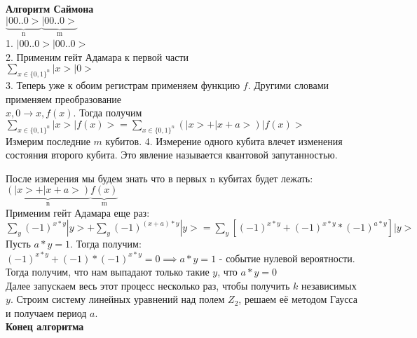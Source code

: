 \documentclass{beamer}
\theoremstyle{plain}
\theoremstyle{definition}
\begin{document}
\begin{frame}
    \textbf{Алгоритм Саймона}\\
    $\underbrace{|00..0>}_\text{n} \underbrace{|00..0>}_\text{m}$ \\
    1. $|00..0> |00..0>$ \\
    2. Применим гейт Адамара к первой части\\
        $\sum_{x \in \{0, 1\}^n} |x>|0>$ \\
    3. Теперь уже к обоим регистрам применяем функцию $f$. Другими словами применяем преобразование \\
        $ x, 0 \rightarrow x, f(x) $. Тогда получим\\
        $\sum_{x \in \{0, 1\}^n} |x>|f(x)> = \sum_{x \in \{0, 1\}^n}(|x> + |x + a>)|f(x)> $ \\
        Измерим последние $m$ кубитов.
    4. Измерение одного кубита влечет изменения состояния второго кубита. Это явление называется квантовой запутанностью.
        
\end{frame}

\begin{frame}
    После измерения мы будем знать что в первых n кубитах будет лежать:\\
    $\underbrace{(|x> + |x+a>)}_\text{n}\underbrace{f(x)}_\text{m}$ \\
    Применим гейт Адамара еще раз: \\
    \vspace{\baselineskip}
    $\sum_{y}(-1)^{x*y}|y> + \sum_{y}(-1)^{(x+a)*y}|y> =
        \sum_{y}[(-1)^{x*y} + (-1)^{x*y}*(-1)^{a*y}]|y>$ \\
    Пусть $a*y = 1$. Тогда получим: \\
    $(-1)^{x*y} + (-1)*(-1)^{x*y} = 0 \implies a*y = 1$ - событие нулевой вероятности. Тогда получим, что нам выпадают только такие $y$, что $ a*y = 0 $ \\
    Далее запускаем весь этот процесс несколько раз, чтобы получить $k$ независимых $y$.  Строим систему линейных уравнений над полем $Z_2$, решаем её методом Гаусса и получаем период $a$.\\
    \textbf{Конец алгоритма}
\end{frame}
\end{document}
